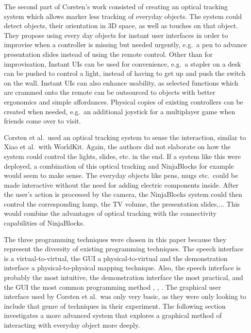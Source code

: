 The second part of Corsten's work consisted of creating an optical tracking system which allows marker less tracking of everyday objects.
The system could detect objects, their orientation in 3D space, as well as touches on that object. 
They propose using every day objects for instant user interfaces in order to improvise when a controller is missing but needed urgently, e.g.\ a pen to advance presentation slides instead of using the remote control.
Other than for improvisation, Instant UIs can be used for convenience, e.g.\ a stapler on a desk can be pushed to control a light, instead of having to get up and push the switch on the wall.
Instant UIs can also enhance usability, as selected functions which are crammed onto the remote can be outsourced to objects with better ergonomics and simple affordances.
Physical copies of existing controllers can be created when needed, e.g.\ an additional joystick for a multiplayer game when friends come over to visit.

Corsten et al.\ used an optical tracking system to sense the interaction, similar to Xiao et al.\ with WorldKit.
Again, the authors did not elaborate on how the system could control the lights, slides, etc. in the end.
If a system like this were deployed, a combination of this optical tracking and NinjaBlocks for example would seem to make sense.
The everyday objects like pens, mugs etc.\ could be made interactive without the need for adding electric components inside. After the user's action is processed by the camera, the NinjaBlocks system could then control the corresponding lamp, the TV volume, the presentation slides,... This would combine the advantages of optical tracking with the connectivity capabilities of NinjaBlocks.

The three programming techniques were chosen in this paper because they represent the diversity of existing programming techniques.
The speech interface is a virtual-to-virtual, the GUI a physical-to-virtual and the demonstration interface a physical-to-physical mapping technique.
Also, the speech interface is probably the most intuitive, the demonstration interface the most practical, and the GUI the most common programming method \cite{heun2013reality}, \cite{cheng10}, \cite{mayer13}.
The graphical user interface used by Corsten et al.\ was only very basic, as they were only looking to include that genre of techniques in their experiment. 
The following section investigates a more advanced system that explores a graphical method of interacting with everyday object more deeply.

